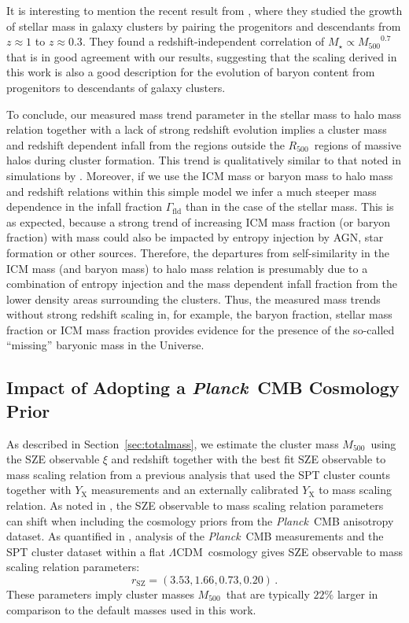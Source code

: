 \documentclass[useAMS,usenatbib,iop,numberedappendix]{mn2e}
\newcommand{\LCDM}{\ensuremath{\Lambda\textrm{CDM}}}
\newcommand{\Rfiveoo}{\ensuremath{R_{500}}}
\newcommand{\Mfiveoo}{\ensuremath{M_{500}}}
\newcommand{\redshift}{\ensuremath{z}}
\newcommand{\PLANCK}{\emph{Planck}}
\newcommand{\Mstar}{\ensuremath{M_{\star}}}
\newcommand{\percent}{\ensuremath{\%}}
\begin{document}
It is interesting to mention the recent result from \cite{lin17}, where they studied the growth of stellar mass in galaxy clusters by pairing the progenitors and descendants from $\redshift\approx1$ to $\redshift\approx0.3$.
They found a redshift-independent correlation of $\Mstar\propto\Mfiveoo^{0.7}$ that is in good agreement with our results, suggesting that the scaling derived in this work is also a good description for the evolution of baryon content from progenitors to descendants of galaxy clusters.



To conclude, our measured mass trend parameter in the stellar mass to halo mass relation together with a lack of strong redshift evolution implies a cluster mass and redshift dependent infall from the regions outside the \Rfiveoo\ regions of massive halos during cluster formation.  This trend is qualitatively similar to that noted in simulations by \citet{mcgee09}.  Moreover, if we use the ICM mass or baryon mass to halo mass and redshift relations within this simple model we infer a much steeper mass dependence in the infall fraction $\Gamma_\mathrm{fld}$ than in the case of the stellar mass.  This is as expected, because a strong trend of increasing ICM mass fraction (or baryon fraction) with mass could also be impacted by entropy injection by AGN, star formation or other sources.  Therefore, the departures from self-similarity in the ICM mass (and baryon mass) to halo mass relation is presumably due to a combination of entropy injection and the mass dependent infall fraction from the lower density areas surrounding the clusters.  
Thus, 
the measured mass trends without strong redshift scaling
in, for example, the baryon fraction, stellar mass fraction or ICM mass fraction provides evidence for the presence of the so-called ``missing'' baryonic mass in the Universe.


\subsection{Impact of Adopting a \PLANCK\ CMB Cosmology Prior}
\label{sec:planckpriors}

As described in Section~\ref{sec:totalmass}, we estimate the cluster mass \Mfiveoo\ using the SZE observable $\xi$ and redshift together with the best fit SZE observable to mass scaling relation from a previous analysis \citep{dehaan16} that used the SPT cluster counts together with $Y_{\mathrm{X}}$ measurements and an externally calibrated $Y_{\mathrm{X}}$ to mass scaling relation.  As noted in \cite{bocquet15}, the SZE observable to mass scaling relation parameters can shift when including the cosmology priors from the \PLANCK\ CMB anisotropy dataset.  As quantified in \cite{dehaan16}, analysis of the \PLANCK\ CMB measurements and the SPT cluster dataset within a flat \LCDM\ cosmology gives SZE observable to mass scaling relation parameters:
\[
r_{\mathrm{SZ}} = \left( 3.53, 1.66, 0.73, 0.20 \right) \, .
\]
These parameters imply cluster masses \Mfiveoo\ that are typically $22\percent$ larger in comparison to the default masses used in this work.
\end{document}
